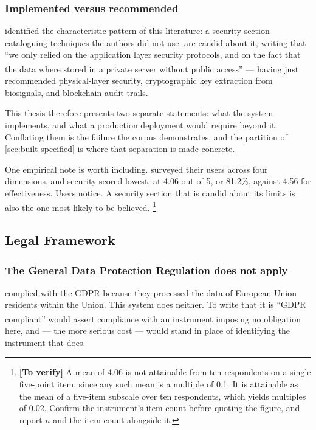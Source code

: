 \documentclass[12pt,a4paper,oneside]{report}
\newcommand{\verify}[1]{\footnote{\textbf{[To verify]} #1}}
\newcommand{\bq}[1]{``#1''\textsuperscript{\dag}}
\begin{document}
\subsubsection{Implemented versus recommended}

 identified the characteristic pattern of this literature: a security section cataloguing techniques the authors did not use. \Textcite{mucchi2021} are candid about it, writing that \bq{we only relied on the application layer security protocols, and on the fact that the data where stored in a private server without public access} --- having just recommended physical-layer security, cryptographic key extraction from biosignals, and blockchain audit trails.

This thesis therefore presents two separate statements: what the system implements, and what a production deployment would require beyond it. Conflating them is the failure the corpus demonstrates, and the partition of \cref{sec:built-specified} is where that separation is made concrete.

One empirical note is worth including. \Textcite{efendi2025} surveyed their users across four dimensions, and security scored lowest, at 4.06 out of 5, or 81.2\%, against 4.56 for effectiveness. Users notice. A security section that is candid about its limits is also the one most likely to be believed.%
\verify{A mean of 4.06 is not attainable from ten respondents on a single five-point item, since any such mean is a multiple of 0.1. It is attainable as the mean of a five-item subscale over ten respondents, which yields multiples of 0.02. Confirm the instrument's item count before quoting the figure, and report $n$ and the item count alongside it.}

\subsection{Legal Framework}\label{sec:legal}

\subsubsection{The General Data Protection Regulation does not apply}\label{sec:gdpr}

\Textcite{mihevc2025} complied with the GDPR because they processed the data of European Union residents within the Union. This system does neither. To write that it is \bq{GDPR compliant} would assert compliance with an instrument imposing no obligation here, and --- the more serious cost --- would stand in place of identifying the instrument that does.
\end{document}
